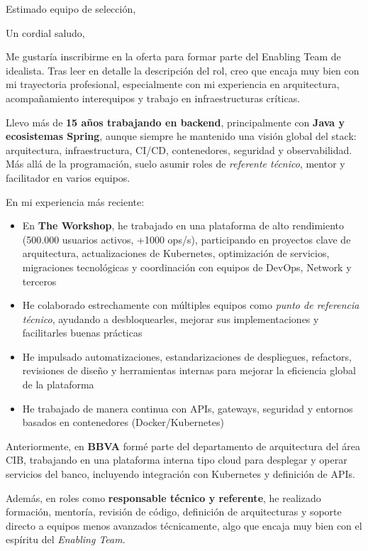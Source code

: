 \documentclass[11pt,a4paper,sans]{moderncv}
\begin{document}
\date{4 de diciembre de 2025}
\subject{Senior Software Engineer - Enabling Team (Remote)}
\opening{Estimado equipo de selección,}
\closing{Un cordial saludo,}

\makelettertitle

\begin{justify}
Me gustaría inscribirme en la oferta para formar parte del Enabling Team de idealista. Tras leer en detalle la descripción del rol, creo que encaja muy bien con mi trayectoria profesional, especialmente con mi experiencia en arquitectura, acompañamiento interequipos y trabajo en infraestructuras críticas.

Llevo más de \textbf{15 años trabajando en backend}, principalmente con \textbf{Java y ecosistemas Spring}, aunque siempre he mantenido una visión global del stack: arquitectura, infraestructura, CI/CD, contenedores, seguridad y observabilidad. Más allá de la programación, suelo asumir roles de \textit{referente técnico}, mentor y facilitador en varios equipos.

En mi experiencia más reciente:

\begin{itemize}
\item En \textbf{The Workshop}, he trabajado en una plataforma de alto rendimiento (500.000 usuarios activos, +1000 ops/s), participando en proyectos clave de arquitectura, actualizaciones de Kubernetes, optimización de servicios, migraciones tecnológicas y coordinación con equipos de DevOps, Network y terceros
\item He colaborado estrechamente con múltiples equipos como \textit{punto de referencia técnico}, ayudando a desbloquearles, mejorar sus implementaciones y facilitarles buenas prácticas
\item He impulsado automatizaciones, estandarizaciones de despliegues, refactors, revisiones de diseño y herramientas internas para mejorar la eficiencia global de la plataforma
\item He trabajado de manera continua con APIs, gateways, seguridad y entornos basados en contenedores (Docker/Kubernetes)
\end{itemize}

Anteriormente, en \textbf{BBVA} formé parte del departamento de arquitectura del área CIB, trabajando en una plataforma interna tipo cloud para desplegar y operar servicios del banco, incluyendo integración con Kubernetes y definición de APIs.

Además, en roles como \textbf{responsable técnico y referente}, he realizado formación, mentoría, revisión de código, definición de arquitecturas y soporte directo a equipos menos avanzados técnicamente, algo que encaja muy bien con el espíritu del \textit{Enabling Team}.


\end{justify}
\end{document}
